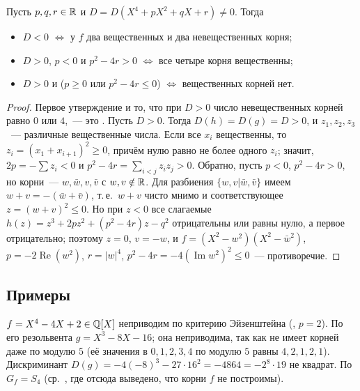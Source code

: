 \begin{proposition}
Пусть $p,q,r\in\mathbb R$ и $D=D(X^4+pX^2+qX+r)\ne0$. Тогда
\begin{itemize}
\item $D<0$ $\iff$ у $f$ два вещественных и два невещественных корня;
\item $D>0$, $p<0$ и $p^2-4r>0$ $\iff$ все четыре корня вещественны;
\item $D>0$ и ($p\ge0$ или $p^2-4r\le0$) $\iff$ вещественных корней нет.
\end{itemize}
\end{proposition}

\begin{proof}
Первое утверждение и то, что при $D>0$ число невещественных корней равно $0$ или $4$,~--- это . Пусть $D>0$. Тогда $D(h)=D(g)=D>0$,
и $z_1,z_2,z_3$~--- различные вещественные числа. Если все $x_i$ вещественны, то $z_i=(x_1+x_{i+1})^2\ge0$, причём нулю равно не более
одного $z_i$; значит, $2p=-\sum z_i<0$ и $p^2-4r=\sum_{i<j}z_iz_j>0$. Обратно, пусть $p<0$, $p^2-4r>0$, но корни~--- $w,\bar w,v,\bar v$ с
$w,v\notin\mathbb R$. Для разбиения $\{w,v|\bar w,\bar v\}$ имеем $w+v=-(\bar w+\bar v)$, т.\,е.\ $w+v$ чисто мнимо и соответствующее $z=(w+v)^2\le0$. Но
при $z<0$ все слагаемые $h(z)=z^3+2pz^2+(p^2-4r)z-q^2$ отрицательны или равны нулю, а первое отрицательно; поэтому $z=0$, $v=-w$, и
$f=(X^2-w^2)(X^2-\bar w^2)$, $p=-2\operatorname{Re}(w^2)$, $r=|w|^4$, $p^2-4r=-4(\operatorname{Im}w^2)^2\le0$~--- противоречие.
\end{proof}

\subsection*{Примеры}

\begin{example}[4.10]
$f=X^4-4X+2\in\mathbb Q[X]$ неприводим по критерию Эйзенштейна (, $p=2$). По  его резольвента
$g=X^3-8X-16$; она неприводима, так как не имеет корней даже по модулю $5$ (её значения в $0,1,2,3,4$ по модулю $5$ равны
$4,2,1,2,1$). Дискриминант $D(g)=-4(-8)^3-27\cdot16^2=-4864=-2^8\cdot19$ не квадрат. По  $G_f=S_4$ (ср.\ , где отсюда
выведено, что корни $f$ не построимы).
\end{example}


